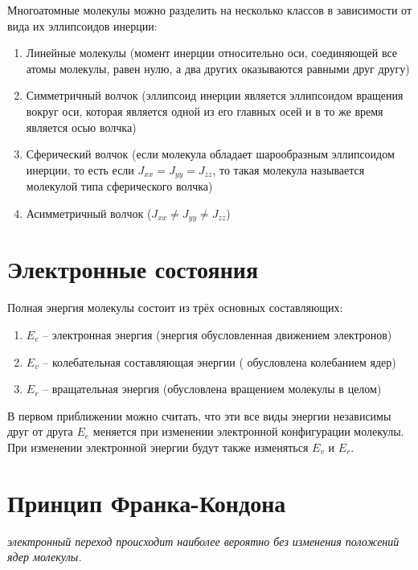 Многоатомные молекулы можно разделить на несколько классов в
зависимости от вида их эллипсоидов инерции:
\begin{enumerate}
	\item Линейные молекулы (момент инерции относительно оси, 
		соединяющей все атомы молекулы, равен нулю, а два 
		других оказываются равными друг другу)
	\item Симметричный волчок (эллипсоид инерции является эллипсоидом
		вращения вокруг оси, которая является одной из его главных осей 
		и в то же время является осью волчка)
	\item Сферический волчок (если молекула обладает шарообразным
		эллипсоидом инерции, то есть если \( J_{xx} = J_{yy} = J_{zz}\), 
		то такая молекула называется молекулой типа сферического волчка)
	\item Асимметричный волчок (\( J_{xx} \neq J_{yy} \neq J_{zz} \))
\end{enumerate}

\section{Электронные состояния}
Полная энергия молекулы состоит из трёх основных составляющих:
\begin{enumerate}
	\item \( E_e \) -- электронная энергия (энергия обусловленная 
		движением электронов)
	\item \( E_v \) -- колебательная составляющая энергии (
		обусловлена колебанием ядер)
	\item \( E_r \) -- вращательная энергия (обусловлена вращением 
		молекулы в целом)
\end{enumerate}
В первом приближении можно считать, что эти все виды энергии независимы 
друг от друга \( E_e \) меняется при изменении электронной конфигурации 
молекулы. При изменении электронной энергии будут также изменяться 
\( E_v \) и  \( E_r \).

\section{Принцип Франка-Кондона}
\emph{электронный переход происходит наиболее вероятно без 
изменения положений ядер молекулы.}

